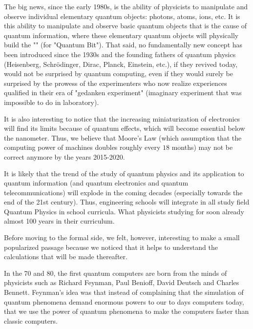 	The big news, since the early 1980s, is the ability of physicists to manipulate and observe individual elementary quantum objects: photons, atoms, ions, etc. It is this ability to manipulate and observe basic quantum objects that is the cause of quantum information, where these elementary quantum objects will physically build the "" (for "Quantum Bit"). That said, no fundamentally new concept has been introduced since the 1930s and the founding fathers of quantum physics (Heisenberg, Schrödinger, Dirac, Planck, Einstein, etc.), if they revived today, would not be surprised by quantum computing, even if they would surely be surprised by the prowess of the experimenters who now realize experiences qualified in their era of "gedanken experiment" (imaginary experiment that was impossible to do in laboratory).
	
	It is also interesting to notice that the increasing miniaturization of electronics will find its limits because of quantum effects, which will become essential below the nanometer. Thus, we believe that Moore's Law (which assumption that the computing power of machines doubles roughly every $18$ months) may not be correct anymore by the years 2015-2020.
	
	It is likely that the trend of the study of quantum physics and its application to quantum information (and quantum electronics and quantum telecommunications) will explode in the coming decades (especially towards the end of the 21st century). Thus, engineering schools will integrate in all study field Quantum Physics in school curricula. What physicists studying for soon already almost 100 years in their curriculum.
	
	Before moving to the formal side, we felt, however, interesting to make a small popularized passage because we noticed that it helps to understand the calculations that will be made thereafter.
	
	In the 70 and 80, the first quantum computers are born from the minds of physicists such as Richard Feynman, Paul Benioff, David Deutsch and Charles Bennett. Feynman's idea was that instead of complaining that the simulation of quantum phenomena demand enormous powers to our to days computers today, that we use the power of quantum phenomena to make the computers faster than classic computers.
	
